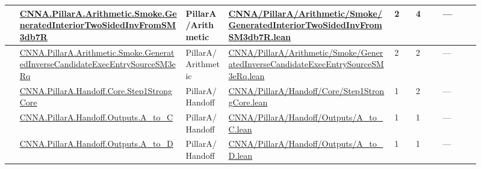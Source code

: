 \begin{longtable}{L{0.025\linewidth} L{0.315\linewidth} L{0.08\linewidth} L{0.315\linewidth} L{0.045\linewidth} L{0.055\linewidth} L{0.07\linewidth}}
\hline
{} & \href{run:repo_snapshot/CNNA/PillarA/Arithmetic/Smoke/GeneratedInteriorTwoSidedInvFromSM3db7R.lean}{CNNA.\allowbreak{}PillarA.\allowbreak{}Arithmetic.\allowbreak{}Smoke.\allowbreak{}GeneratedInteriorTwoSidedInvFromSM3db7R} & PillarA/\allowbreak{}Arithmetic & \href{run:repo_snapshot/CNNA/PillarA/Arithmetic/Smoke/GeneratedInteriorTwoSidedInvFromSM3db7R.lean}{CNNA/\allowbreak{}PillarA/\allowbreak{}Arithmetic/\allowbreak{}Smoke/\allowbreak{}GeneratedInteriorTwoSidedInvFromSM3db7R.\allowbreak{}lean} & 2 & 4 & ---\\
\hline
{} & \href{run:repo_snapshot/CNNA/PillarA/Arithmetic/Smoke/GeneratedInverseCandidateExecEntrySourceSM3eRq.lean}{CNNA.\allowbreak{}PillarA.\allowbreak{}Arithmetic.\allowbreak{}Smoke.\allowbreak{}GeneratedInverseCandidateExecEntrySourceSM3eRq} & PillarA/\allowbreak{}Arithmetic & \href{run:repo_snapshot/CNNA/PillarA/Arithmetic/Smoke/GeneratedInverseCandidateExecEntrySourceSM3eRq.lean}{CNNA/\allowbreak{}PillarA/\allowbreak{}Arithmetic/\allowbreak{}Smoke/\allowbreak{}GeneratedInverseCandidateExecEntrySourceSM3eRq.\allowbreak{}lean} & 2 & 2 & ---\\
\hline
{} & \href{run:repo_snapshot/CNNA/PillarA/Handoff/Core/Step1StrongCore.lean}{CNNA.\allowbreak{}PillarA.\allowbreak{}Handoff.\allowbreak{}Core.\allowbreak{}Step1StrongCore} & PillarA/\allowbreak{}Handoff & \href{run:repo_snapshot/CNNA/PillarA/Handoff/Core/Step1StrongCore.lean}{CNNA/\allowbreak{}PillarA/\allowbreak{}Handoff/\allowbreak{}Core/\allowbreak{}Step1StrongCore.\allowbreak{}lean} & 1 & 2 & ---\\
\hline
{} & \href{run:repo_snapshot/CNNA/PillarA/Handoff/Outputs/A_to_C.lean}{CNNA.\allowbreak{}PillarA.\allowbreak{}Handoff.\allowbreak{}Outputs.\allowbreak{}A\_to\_C} & PillarA/\allowbreak{}Handoff & \href{run:repo_snapshot/CNNA/PillarA/Handoff/Outputs/A_to_C.lean}{CNNA/\allowbreak{}PillarA/\allowbreak{}Handoff/\allowbreak{}Outputs/\allowbreak{}A\_to\_C.\allowbreak{}lean} & 1 & 1 & ---\\
\hline
{} & \href{run:repo_snapshot/CNNA/PillarA/Handoff/Outputs/A_to_D.lean}{CNNA.\allowbreak{}PillarA.\allowbreak{}Handoff.\allowbreak{}Outputs.\allowbreak{}A\_to\_D} & PillarA/\allowbreak{}Handoff & \href{run:repo_snapshot/CNNA/PillarA/Handoff/Outputs/A_to_D.lean}{CNNA/\allowbreak{}PillarA/\allowbreak{}Handoff/\allowbreak{}Outputs/\allowbreak{}A\_to\_D.\allowbreak{}lean} & 1 & 1 & ---\\
\hline

\end{longtable}
